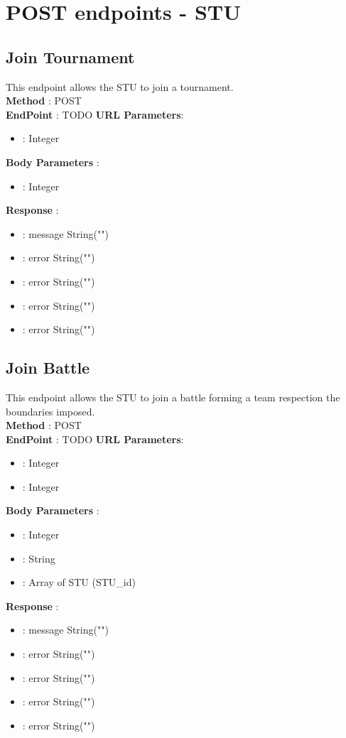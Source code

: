 \section*{POST endpoints - STU}
\subsection*{Join Tournament}
This endpoint allows the STU to join a tournament.\\
\textbf{Method} : POST \\
\textbf{EndPoint} : {\color{blue} TODO}
\textbf{URL Parameters}:
\begin{itemize}
    \item {} : Integer
\end{itemize}
\textbf{Body Parameters} :
\begin{itemize}
    \item {} : Integer   
\end{itemize}
\textbf{Response} :
\begin{itemize}
    \item {} : message String("")
    \item {} : error String("")
    \item {} : error String("")
    \item {} : error String("")
    \item {} : error String("")
\end{itemize}

\subsection*{Join Battle}
This endpoint allows the STU to join a battle forming a team respection the boundaries imposed.\\
\textbf{Method} : POST \\
\textbf{EndPoint} : {\color{blue} TODO}
\textbf{URL Parameters}:
\begin{itemize}
    \item {} : Integer
    \item {} : Integer   
\end{itemize}
\textbf{Body Parameters} :
\begin{itemize}
    \item {} : Integer  
    \item {} : String  
    \item {} : Array of STU (STU_id)  
\end{itemize}
\textbf{Response} :
\begin{itemize}
    \item {} : message String("")
    \item {} : error String("")
    \item {} : error String("")
    \item {} : error String("")
    \item {} : error String("")
\end{itemize}

